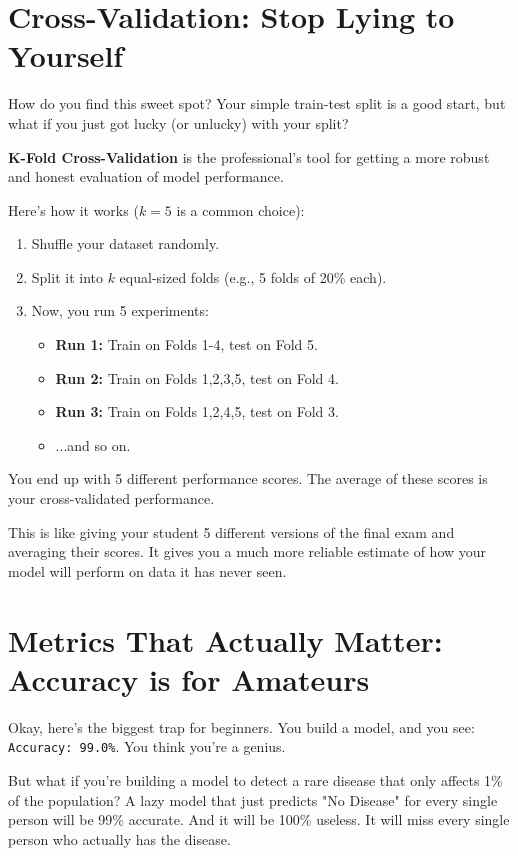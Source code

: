\documentclass[11pt, letterpaper, openany]{book}
\begin{document}
\section{Cross-Validation: Stop Lying to Yourself}

How do you find this sweet spot? Your simple train-test split is a good start, but what if you just got lucky (or unlucky) with your split?

\textbf{K-Fold Cross-Validation} is the professional's tool for getting a more robust and honest evaluation of model performance.

Here's how it works ($k=5$ is a common choice):
\begin{enumerate}
    \item Shuffle your dataset randomly.
    \item Split it into $k$ equal-sized folds (e.g., 5 folds of 20\% each).
    \item Now, you run 5 experiments:
    \begin{itemize}
        \item \textbf{Run 1:} Train on Folds 1-4, test on Fold 5.
        \item \textbf{Run 2:} Train on Folds 1,2,3,5, test on Fold 4.
        \item \textbf{Run 3:} Train on Folds 1,2,4,5, test on Fold 3.
        \item ...and so on.
    \end{itemize}
\end{enumerate}
You end up with 5 different performance scores. The average of these scores is your cross-validated performance.

This is like giving your student 5 different versions of the final exam and averaging their scores. It gives you a much more reliable estimate of how your model will perform on data it has never seen.

\section{Metrics That Actually Matter: Accuracy is for Amateurs}

Okay, here's the biggest trap for beginners. You build a model, and you see: \texttt{Accuracy: 99.0\%}. You think you're a genius.

But what if you're building a model to detect a rare disease that only affects 1\% of the population? A lazy model that just predicts "No Disease" for every single person will be 99\% accurate. And it will be 100\% useless. It will miss every single person who actually has the disease.
\end{document}

